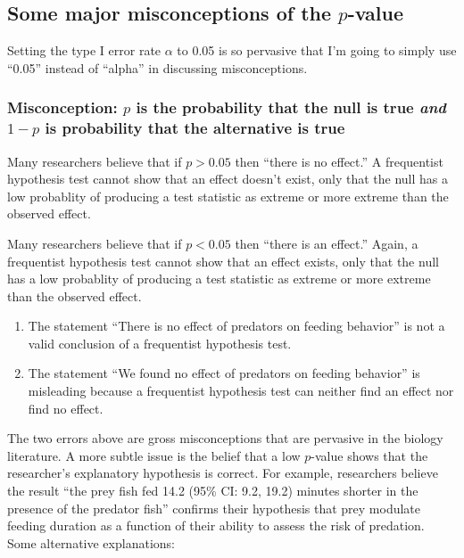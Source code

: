 \documentclass[]{book}
\providecommand{\tightlist}{%
  \setlength{\itemsep}{0pt}\setlength{\parskip}{0pt}}
\theoremstyle{definition}
\theoremstyle{definition}
\theoremstyle{definition}
\theoremstyle{remark}
\begin{document}
\subsection{\texorpdfstring{Some major misconceptions of the
\(p\)-value}{Some major misconceptions of the p-value}}\label{some-major-misconceptions-of-the-p-value}

Setting the type I error rate \(\alpha\) to 0.05 is so pervasive that
I'm going to simply use ``0.05'' instead of ``alpha'' in discussing
misconceptions.

\subsubsection{\texorpdfstring{Misconception: \(p\) is the probability
that the null is true \emph{and} \(1-p\) is probability that the
alternative is
true}{Misconception: p is the probability that the null is true and 1-p is probability that the alternative is true}}\label{misconception-p-is-the-probability-that-the-null-is-true-and-1-p-is-probability-that-the-alternative-is-true}

Many researchers believe that if \(p > 0.05\) then ``there is no
effect.'' A frequentist hypothesis test cannot show that an effect
doesn't exist, only that the null has a low probablity of producing a
test statistic as extreme or more extreme than the observed effect.

Many researchers believe that if \(p < 0.05\) then ``there is an
effect.'' Again, a frequentist hypothesis test cannot show that an
effect exists, only that the null has a low probablity of producing a
test statistic as extreme or more extreme than the observed effect.

\begin{enumerate}
\def\labelenumi{\arabic{enumi}.}
\tightlist
\item
  The statement ``There is no effect of predators on feeding behavior''
  is not a valid conclusion of a frequentist hypothesis test.
\item
  The statement ``We found no effect of predators on feeding behavior''
  is misleading because a frequentist hypothesis test can neither find
  an effect nor find no effect.
\end{enumerate}

The two errors above are gross misconceptions that are pervasive in the
biology literature. A more subtle issue is the belief that a low
\(p\)-value shows that the researcher's explanatory hypothesis is
correct. For example, researchers believe the result ``the prey fish fed
14.2 (95\% CI: 9.2, 19.2) minutes shorter in the presence of the
predator fish'' confirms their hypothesis that prey modulate feeding
duration as a function of their ability to assess the risk of predation.
Some alternative explanations:
\end{document}
